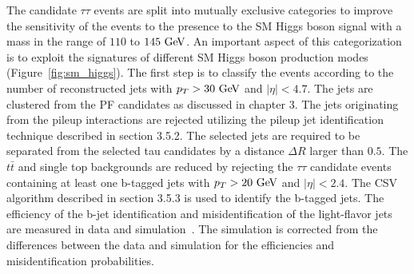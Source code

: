 The candidate $\tau\tau$  events are split into mutually exclusive categories to improve the sensitivity of the events to the presence to the SM Higgs boson signal with a mass in the range of $110$ to $145~\mathrm{Ge\kern -0.1em V}$. An important aspect of this categorization is to exploit the signatures of different SM Higgs boson production modes (Figure~\ref{fig:sm_higgs}). The first step is to classify the events according to the number of reconstructed jets with $p_{T}>30~\mathrm{Ge\kern -0.1em V}$ and $|\eta|<4.7$. The jets are clustered from the PF candidates as discussed in chapter 3. The jets originating from the pileup interactions are rejected utilizing the pileup jet identification technique described in section 3.5.2. The selected jets are  required to be separated from the selected tau candidates by a distance $\Delta R$ larger than $0.5$. The $t\bar{t}$ and single top backgrounds are reduced by rejecting the $\tau\tau$ candidate events containing at least one b-tagged jets with $p_{T}>20~\mathrm{Ge\kern -0.1em V}$ and $|\eta|<2.4$. The CSV algorithm described in section 3.5.3 is used to identify the b-tagged jets. The efficiency of the b-jet identification and misidentification of the light-flavor jets are measured in data and simulation~\cite{Chatrchyan:2012jua}. The simulation is corrected from the differences between the data and simulation for the efficiencies and misidentification probabilities.

